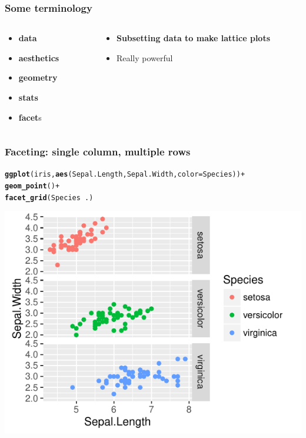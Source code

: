 \documentclass{beamer}\usepackage[]{graphicx}\usepackage[]{color}
\makeatletter
\newcommand{\hlopt}[1]{\textcolor[rgb]{0,0,0}{#1}}%
\newcommand{\hlstd}[1]{\textcolor[rgb]{0.345,0.345,0.345}{#1}}%
\newcommand{\hlkwc}[1]{\textcolor[rgb]{0.333,0.667,0.333}{#1}}%
\newcommand{\hlkwd}[1]{\textcolor[rgb]{0.737,0.353,0.396}{\textbf{#1}}}%
\newenvironment{kframe}{%
 \def\at@end@of@kframe{}%
 \ifinner\ifhmode%
  \def\at@end@of@kframe{\end{minipage}}%
  \begin{minipage}{\columnwidth}%
 \fi\fi%
 \def\FrameCommand##1{\hskip\@totalleftmargin \hskip-\fboxsep
 \colorbox{shadecolor}{##1}\hskip-\fboxsep
     \hskip-\linewidth \hskip-\@totalleftmargin \hskip\columnwidth}%
 \MakeFramed {\advance\hsize-\width
   \@totalleftmargin\z@ \linewidth\hsize
   \@setminipage}}%
 {\par\unskip\endMakeFramed%
 \at@end@of@kframe}
\newenvironment{knitrout}{}{} %
\makeatother
\begin{document}
\begin{frame}[fragile]
\frametitle{Some terminology}
\begin{columns}[t]

\begin{column}[T]{3cm}
\begin{itemize}
    \item \textbf{\color{gray}data}
    \item \textbf{\color{gray}aesthetics}
    \item \textbf{\color{gray}geometry}
    \item \textbf{\color{gray}stats}
    \item \textbf{facet}s
\end{itemize}
\end{column}

\begin{column}[T]{8cm}
\begin{itemize}
    \item \textbf{Subsetting data to make lattice plots}
    \item Really powerful
\end{itemize}
\end{column}

\end{columns}
\end{frame}


\begin{frame}[fragile]
\frametitle{Faceting: single column, multiple rows}
\begin{knitrout}\footnotesize
{}\color{fgcolor}\begin{kframe}
\begin{alltt}
\hlkwd{ggplot}\hlstd{(iris,} \hlkwd{aes}\hlstd{(Sepal.Length, Sepal.Width,} \hlkwc{color} \hlstd{= Species))} \hlopt{+}
    \hlkwd{geom_point}\hlstd{()} \hlopt{+}
    \hlkwd{facet_grid}\hlstd{(Species} \hlopt{~} \hlstd{.)}
\end{alltt}
\end{kframe}

{\centering \includegraphics[width=.75\linewidth]{figure/facetgrid1-1} 

}



\end{knitrout}
\end{frame}
\end{document}
